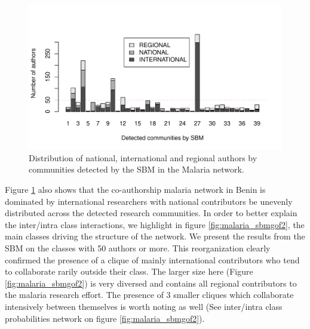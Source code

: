 \begin{figure}[!ht]
\centering
\includegraphics[scale=0.75]{Chapters/malaria/statMod/unnamed-chunk-2-1}
\caption{Distribution of national, international and regional authors by communities detected by the SBM in the Malaria network.}
\label{fig:malaria_dist}
\end{figure}

Figure \ref{fig:malaria_dist} also shows that the co-authorship malaria network in Benin is dominated by international researchers with national contributors be unevenly distributed across the detected research communities. In order to better explain the inter/intra class interactions, we highlight in figure \ref{fig:malaria_sbmgof2}, the main classes driving the structure of the network. We present the results from the SBM on the classes with 50 authors or more. This reorganization clearly confirmed the presence of a clique of mainly international contributors who tend to collaborate rarily outside their class. The larger size here (Figure \ref{fig:malaria_sbmgof2}) is very diversed and contains all regional contributors to the malaria research effort. The presence of 3 smaller cliques which collaborate intensively between themselves is worth noting as well (See inter/intra class probabilities network on figure \ref{fig:malaria_sbmgof2}).

